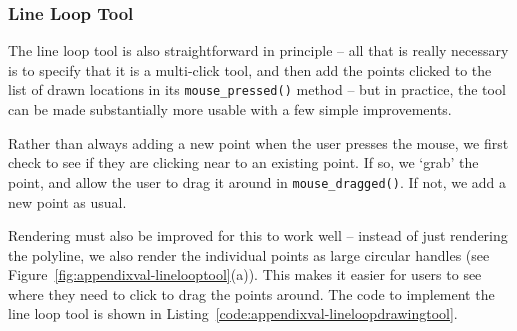 \subsubsection{Line Loop Tool}

The line loop tool is also straightforward in principle -- all that is really necessary is to specify that it is a multi-click tool, and then add the points clicked to the list of drawn locations in its \texttt{mouse_pressed()} method -- but in practice, the tool can be made substantially more usable with a few simple improvements.

Rather than always adding a new point when the user presses the mouse, we first check to see if they are clicking near to an existing point. If so, we `grab' the point, and allow the user to drag it around in \texttt{mouse_dragged()}. If not, we add a new point as usual.

Rendering must also be improved for this to work well -- instead of just rendering the polyline, we also render the individual points as large circular handles (see Figure~\ref{fig:appendixval-linelooptool}(a)). This makes it easier for users to see where they need to click to drag the points around. The code to implement the line loop tool is shown in Listing~\ref{code:appendixval-lineloopdrawingtool}.


